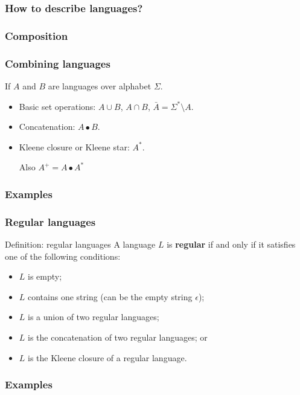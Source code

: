 \begin{frame}
  \frametitle{How to describe languages?}
\end{frame}

\begin{frame}
  \frametitle{Composition}
\end{frame}

\begin{frame}
  \frametitle{Combining languages}

  If $A$ and $B$ are languages over alphabet $\Sigma$.
  
  \begin{itemize}
  \item Basic set operations: $A\cup B$, $A\cap B$, $\bar{A}=\Sigma^*\setminus A$.
  \item Concatenation: $A\bullet B$.
    \vspace{1in}
  \item Kleene closure or Kleene star: $A^*$.

    \vspace{1in}
    
    Also $A^+=A\bullet A^*$
  \end{itemize}
\end{frame}

\begin{frame}
  \frametitle{Examples}
\end{frame}

\begin{frame}
  \frametitle{Regular languages}
  \begin{block}{Definition: regular languages}
    A language $L$ is {\color{red}\bf regular} if and only if it
    satisfies one of the following conditions:
    \begin{itemize}
    \item $L$ is empty;
    \item $L$ contains one string (can be the empty string $\epsilon$);
    \item $L$ is a union of two regular languages;
    \item $L$ is the concatenation of two regular languages; or
    \item $L$ is the Kleene closure of a regular language.
    \end{itemize}
  \end{block}
\end{frame}

\begin{frame}
  \frametitle{Examples}
\end{frame}

